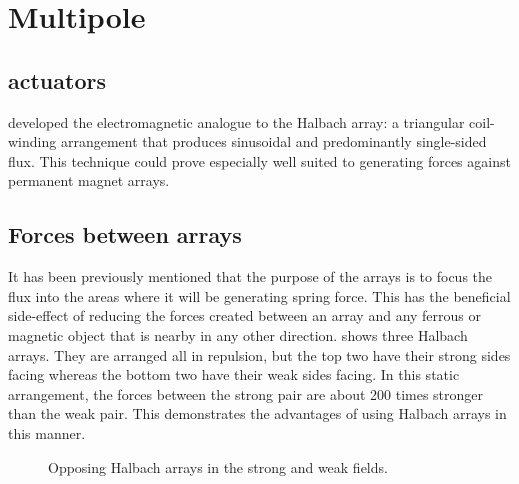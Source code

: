 
\chapter{Multipole}


\section{actuators}

\textcite{trumper1996} developed the electromagnetic analogue to the
Halbach array: a triangular coil-winding arrangement that produces
sinusoidal and predominantly single-sided flux. This technique could
prove especially well suited to generating forces against permanent
magnet arrays.

\section{Forces between arrays}

It has been previously mentioned that the purpose of the arrays is to focus
the flux into the areas where it will be generating spring force. This has the
beneficial side-effect of reducing the forces created between an array and any
ferrous or magnetic object that is nearby in any other direction.
 shows three Halbach arrays. They are arranged all in
repulsion, but the top two have their strong sides facing whereas the bottom
two have their weak sides facing. In this static arrangement, the forces
between the strong pair are about 200 times stronger than the weak pair. This
demonstrates the advantages of using Halbach arrays in this manner.

\begin{figure}[htbp]
   \centering
   \caption{Opposing Halbach arrays in the strong and weak fields.}
\end{figure}

